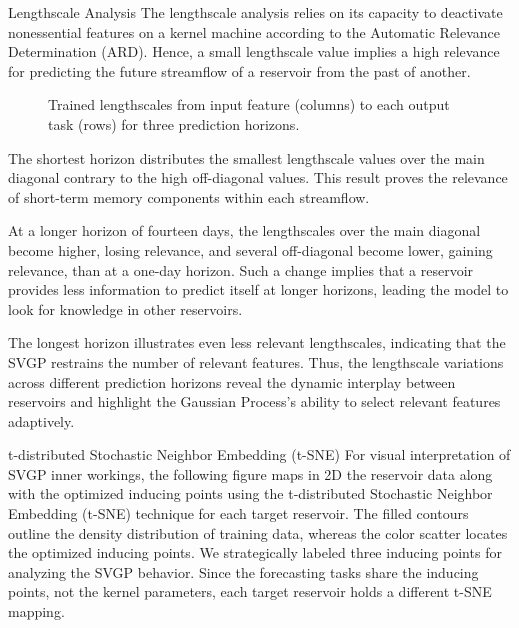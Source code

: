 \begin{frame}{Lengthscale Analysis}
	The lengthscale analysis relies on its capacity to deactivate nonessential features on a kernel machine according to the Automatic Relevance Determination (ARD). Hence, a small lengthscale value implies a high relevance for predicting the future streamflow of a reservoir from the past of another.
	\begin{figure}[htbp]
		\centering
		\setlength{} 
		\setlength{}
		\subfloat[$H=1.$]{}\hspace{-1.3em}
		\subfloat[$H=14.$]{}\hspace{-1.3em}
		\subfloat[$H=30.$]{}
		\caption{Trained lengthscales from input feature (columns) to each output task (rows) for three prediction horizons.}
	\end{figure}
\end{frame}

\begin{frame}
	The shortest horizon distributes the smallest lengthscale values over the main diagonal contrary to the high off-diagonal values. This result proves the relevance of short-term memory components within each streamflow.
	
	At a longer horizon of fourteen days, the lengthscales over the main diagonal become higher, losing relevance, and several off-diagonal become lower, gaining relevance, than at a one-day horizon. Such a change implies that a reservoir provides less information to predict itself at longer horizons, leading the model to look for knowledge in other reservoirs.
	
	The longest horizon illustrates even less relevant lengthscales, indicating that the SVGP restrains the number of relevant features. Thus, the lengthscale variations across different prediction horizons reveal the dynamic interplay between reservoirs and highlight the Gaussian Process's ability to select relevant features adaptively.
	
\end{frame}

\begin{frame}{t-distributed Stochastic Neighbor Embedding (t-SNE)}
	For visual interpretation of SVGP inner workings, the following figure maps in 2D the reservoir data along with the optimized inducing points using the t-distributed Stochastic Neighbor Embedding (t-SNE) technique for each target reservoir. The filled contours outline the density distribution of training data, whereas the color scatter locates the optimized inducing points. We strategically labeled three inducing points for analyzing the SVGP behavior.
	Since the forecasting tasks share the inducing points, not the kernel parameters, each target reservoir holds a different t-SNE mapping.
	
\end{frame}

